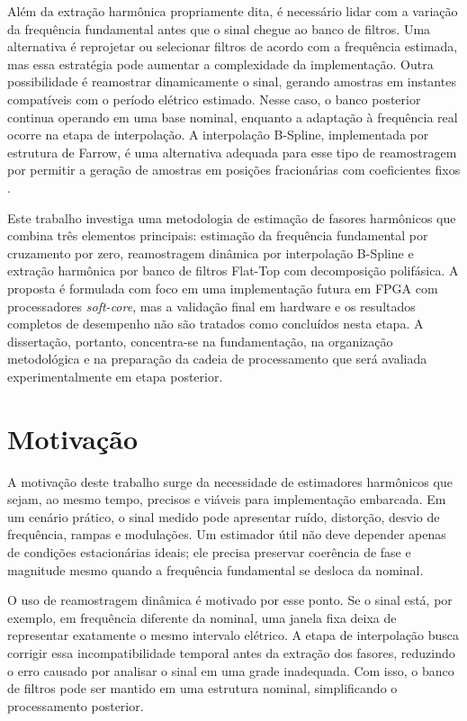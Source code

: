 Além da extração harmônica propriamente dita, é necessário lidar com a variação da frequência fundamental antes que o sinal chegue ao banco de filtros. Uma alternativa é reprojetar ou selecionar filtros de acordo com a frequência estimada, mas essa estratégia pode aumentar a complexidade da implementação. Outra possibilidade é reamostrar dinamicamente o sinal, gerando amostras em instantes compatíveis com o período elétrico estimado. Nesse caso, o banco posterior continua operando em uma base nominal, enquanto a adaptação à frequência real ocorre na etapa de interpolação. A interpolação B-Spline, implementada por estrutura de Farrow, é uma alternativa adequada para esse tipo de reamostragem por permitir a geração de amostras em posições fracionárias com coeficientes fixos \cite{aleixo2022}.

Este trabalho investiga uma metodologia de estimação de fasores harmônicos que combina três elementos principais: estimação da frequência fundamental por cruzamento por zero, reamostragem dinâmica por interpolação B-Spline e extração harmônica por banco de filtros Flat-Top com decomposição polifásica. A proposta é formulada com foco em uma implementação futura em FPGA com processadores \textit{soft-core}, mas a validação final em hardware e os resultados completos de desempenho não são tratados como concluídos nesta etapa. A dissertação, portanto, concentra-se na fundamentação, na organização metodológica e na preparação da cadeia de processamento que será avaliada experimentalmente em etapa posterior.

\section{Motivação}

A motivação deste trabalho surge da necessidade de estimadores harmônicos que sejam, ao mesmo tempo, precisos e viáveis para implementação embarcada. Em um cenário prático, o sinal medido pode apresentar ruído, distorção, desvio de frequência, rampas e modulações. Um estimador útil não deve depender apenas de condições estacionárias ideais; ele precisa preservar coerência de fase e magnitude mesmo quando a frequência fundamental se desloca da nominal.

O uso de reamostragem dinâmica é motivado por esse ponto. Se o sinal está, por exemplo, em frequência diferente da nominal, uma janela fixa deixa de representar exatamente o mesmo intervalo elétrico. A etapa de interpolação busca corrigir essa incompatibilidade temporal antes da extração dos fasores, reduzindo o erro causado por analisar o sinal em uma grade inadequada. Com isso, o banco de filtros pode ser mantido em uma estrutura nominal, simplificando o processamento posterior.

